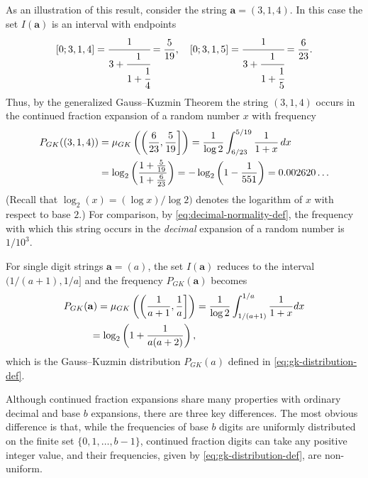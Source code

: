 \documentclass[10pt]{article}
\theoremstyle{definition}
\numberwithin{equation}{section}
\numberwithin{lemma}{section}
\newcommand{\bfa}{\mathbf{a}}
\begin{document}
As an illustration of this result, consider the string $\bfa=(3,1,4)$. 
In this case the set $I(\bfa)$ is an interval with endpoints
\begin{equation}
\notag
[0;3,1,4] = \cfrac{1}{3+\cfrac{1}{1+\cfrac{1}{4}}} = \frac{5}{19},
\quad
[0;3,1,5] = \cfrac{1}{3+\cfrac{1}{1+\cfrac{1}{5}}} = \frac{6}{23}.
\end{equation}
Thus, by the generalized Gauss--Kuzmin Theorem the string $(3,1,4)$ occurs in the
continued fraction expansion of a random number $x$ with frequency 
\begin{align}
P_{GK}((3,1,4))&=
\mu_{GK}\left(\left(\frac6{23},\frac{5}{19}\right]\right)=
\frac{1}{\log 2}\int_{6/23}^{5/19}\frac{1}{1+x}\,dx
\notag
\\
\label{eq:example-P314}
&=\log_2\left(\frac{1+\frac{5}{19}}{1+\frac{6}{23}}\right)
= -\log_2\left(1-\frac1{551}\right)=0.002620\dots
\end{align}
(Recall that $\log_2(x)=(\log x)/\log 2)$ denotes the logarithm of $x$ with
respect to base $2$.)
For comparison, by \eqref{eq:decimal-normality-def}, the
frequency with which this string occurs in the \emph{decimal} expansion
of a random number is $1/10^{3}$.


For single digit strings $\bfa=(a)$, the set $I(\bfa)$ reduces to
the interval $(1/(a+1),1/a]$ and the frequency $P_{GK}(\bfa)$ becomes
\begin{align}
P_{GK}(\bfa)=\mu_{GK}\left(\left(\frac1{a+1},\frac1a\right]\right)
&=\frac1{\log
2}\int_{1/(a+1)}^{1/a} \frac{1}{1+x}dx
\notag
\\
=\log_2\left(1+\frac1{a(a+2)}\right),
\notag
\end{align} 
which is the Gauss--Kuzmin distribution $P_{GK}(a)$ defined in 
\eqref{eq:gk-distribution-def}.

Although continued fraction expansions share many properties 
with ordinary decimal and base $b$ expansions, there are three key 
differences. The most obvious difference is that, while the frequencies of
base $b$ digits are uniformly distributed on the finite set
$\{0,1,\dots,b-1\}$,  continued fraction digits 
can take any positive integer value, and 
their frequencies, given by \eqref{eq:gk-distribution-def}, are non-uniform.
\end{document}
